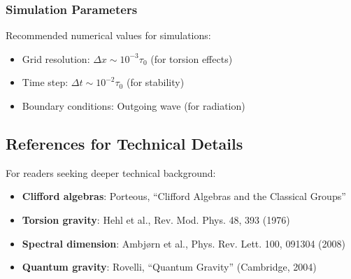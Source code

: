 \subsubsection{Simulation Parameters}

Recommended numerical values for simulations:
\begin{itemize}
    \item Grid resolution: $\Delta x \sim 10^{-3}\tau_0$ (for torsion effects)
    \item Time step: $\Delta t \sim 10^{-2}\tau_0$ (for stability)
    \item Boundary conditions: Outgoing wave (for radiation)
\end{itemize}

\subsection{References for Technical Details}

For readers seeking deeper technical background:
\begin{itemize}
    \item \textbf{Clifford algebras}: Porteous, ``Clifford Algebras and the Classical Groups''
    \item \textbf{Torsion gravity}: Hehl et al., Rev. Mod. Phys. 48, 393 (1976)
    \item \textbf{Spectral dimension}: Ambjørn et al., Phys. Rev. Lett. 100, 091304 (2008)
    \item \textbf{Quantum gravity}: Rovelli, ``Quantum Gravity'' (Cambridge, 2004)
\end{itemize}